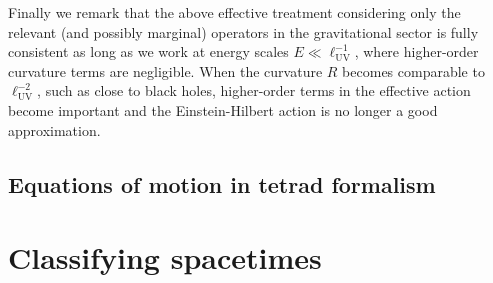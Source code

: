 \begin{mytheorem}
Finally we remark that the above effective treatment considering only the relevant (and possibly marginal) operators in the gravitational sector is fully consistent as long as we work at energy scales $E\ll \ell_{\mathrm{UV}}^{-1}$, where higher-order curvature terms are negligible.
When the curvature $R$ becomes comparable to $\ell_{\mathrm{UV}}^{-2}$, such as close to black holes, higher-order terms in the effective action become important and the Einstein-Hilbert action is no longer a good approximation.
\end{mytheorem}




\subsection{Equations of motion in tetrad formalism}



















\section{Classifying spacetimes}

